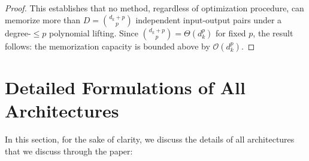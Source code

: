 \begin{proof}
This establishes that no method, regardless of optimization procedure, can memorize more than $D = \binom{d_k + p}{p}$ independent input-output pairs under a degree-$\le p$ polynomial lifting. Since $\binom{d_k + p}{p} = \Theta(d_k^p)$ for fixed $p$, the result follows: the memorization capacity is bounded above by $\mathcal{O}(d_k^p)$.
\end{proof}














\section{Detailed Formulations of All Architectures}\label{app:all-arch}
In this section, for the sake of clarity, we discuss the details of all architectures that we discuss through the paper:

